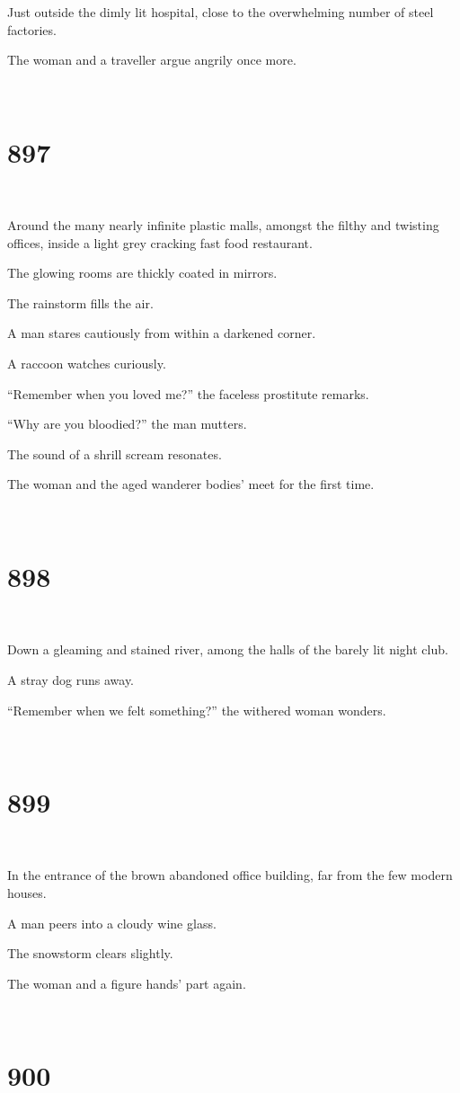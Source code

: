 \documentclass{report}
\begin{document}
Just outside the dimly lit hospital, close to the overwhelming number of steel factories.

The woman and a traveller argue angrily once more.

~
\chapter*{897}
~

Around the many nearly infinite plastic malls, amongst the filthy and twisting offices, inside a light grey cracking fast food restaurant.

The glowing rooms are thickly coated in mirrors.

The rainstorm fills the air.

A man stares cautiously from within a darkened corner.

A raccoon watches curiously.

``Remember when you loved me?'' the faceless prostitute remarks.

``Why are you bloodied?'' the man mutters.

The sound of a shrill scream resonates.

The woman and the aged wanderer bodies' meet for the first time.

~
\chapter*{898}
~

Down a gleaming and stained river, among the halls of the barely lit night club.

A stray dog runs away.

``Remember when we felt something?'' the withered woman wonders.

~
\chapter*{899}
~

In the entrance of the brown abandoned office building, far from the few modern houses.

A man peers into a cloudy wine glass.

The snowstorm clears slightly.

The woman and a figure hands' part again.

~
\chapter*{900}
~
\end{document}
